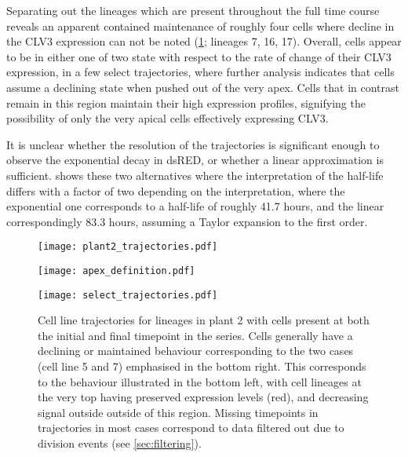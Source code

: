 Separating out the lineages which are present throughout the full time course
reveals an apparent contained maintenance of roughly four cells where decline in the
CLV3 expression can not be noted (\cref{fig:trajectories}; lineages 7, 16,
17). Overall, cells appear to be in either one of two state with respect to
the rate of change of their CLV3 expression, in a few select trajectories, where
further analysis indicates that cells  
assume a declining state when pushed out of the very apex. Cells that in
contrast remain in this region maintain their high expression profiles,
signifying the possibility of only the very apical cells effectively expressing
CLV3. 

It is unclear whether the resolution of the trajectories is significant
enough to observe the exponential decay in dsRED, or whether a linear
approximation is sufficient.  shows these two alternatives
where the interpretation of the half-life differs with a factor of two depending
on the interpretation, where the exponential one corresponds to a half-life of
roughly 41.7 hours, and the linear correspondingly 83.3 hours, assuming a Taylor
expansion to the first order. 

\begin{figure}[H]
  \centering
  \begin{minipage}{\textwidth}
    \texttt{[image: plant2\_trajectories.pdf]}
    \vspace{1cm}
      \centering
      \begin{minipage}{0.39\textwidth}
      \centering
      \texttt{[image: apex\_definition.pdf]}
    \end{minipage}\hfill
    \begin{minipage}{.59\textwidth}
      \centering
      \texttt{[image: select\_trajectories.pdf]} 
    \end{minipage}
  \end{minipage}
  \caption[Cell line trajectories]{Cell line trajectories for lineages in plant 2 with cells present
      at both the initial and final timepoint in the series. Cells generally
      have a declining or maintained behaviour corresponding to the two cases
      (cell line 5 and 7)
      emphasised in the bottom right. This corresponds to the behaviour
      illustrated in the bottom left, with cell lineages at the very top having
      preserved expression levels (red), and decreasing signal outside outside of
      this region. Missing timepoints in trajectories in most cases correspond
      to data filtered out due to division events (see \cref{sec:filtering}).}
    \label{fig:trajectories}
\end{figure}

